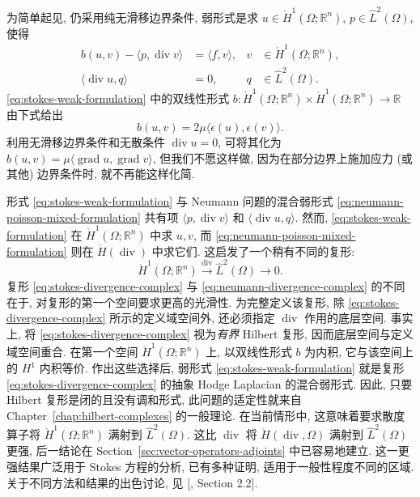 {为简单起见, 仍采用纯无滑移边界条件, 弱形式是求 $u\in\mathring H^1(\Omega;\mathbb R^n)$, $p\in\hat L^2(\Omega)$, 使得}
\begin{equation}\label{eq:stokes-weak-formulation}
\begin{aligned}b(u,v)-\langle p,\operatorname{div}v\rangle&=\langle f,v\rangle,&v&\in\mathring H^1(\Omega;\mathbb R^n),\\\langle\operatorname{div}u,q\rangle&=0,&q&\in\hat L^2(\Omega).\end{aligned}
\end{equation}
{\eqref{eq:stokes-weak-formulation} 中的双线性形式 $b:\mathring H^1(\Omega;\mathbb R^n)\times\mathring H^1(\Omega;\mathbb R^n)\to\mathbb R$ 由下式给出}
\begin{equation}\label{eq:stokes-strain-bilinear-form}
b(u,v)=2\mu\langle\epsilon(u),\epsilon(v)\rangle.
\end{equation}
{利用无滑移边界条件和无散条件 $\operatorname{div}u=0$, 可将其化为 $b(u,v)=\mu\langle\operatorname{grad}u,\operatorname{grad}v\rangle$, 但我们不愿这样做, 因为在部分边界上施加应力 (或其他) 边界条件时, 就不再能这样化简.}

{形式 \eqref{eq:stokes-weak-formulation} 与 Neumann 问题的混合弱形式 \eqref{eq:neumann-poisson-mixed-formulation} 共有项 $\langle p,\operatorname{div}v\rangle$ 和 $\langle\operatorname{div}u,q\rangle$. 然而, \eqref{eq:stokes-weak-formulation} 在 $\mathring H^1(\Omega;\mathbb R^n)$ 中求 $u,v$, 而 \eqref{eq:neumann-poisson-mixed-formulation} 则在 $\mathring H(\operatorname{div})$ 中求它们. 这启发了一个稍有不同的复形:}
\begin{equation}\label{eq:stokes-divergence-complex}
\mathring H^1(\Omega;\mathbb R^n)\xrightarrow{\operatorname{div}}\hat L^2(\Omega)\to0.
\end{equation}
{复形 \eqref{eq:stokes-divergence-complex} 与 \eqref{eq:neumann-divergence-complex} 的不同在于, 对复形的第一个空间要求更高的光滑性. 为完整定义该复形, 除 \eqref{eq:stokes-divergence-complex} 所示的定义域空间外, 还必须指定 $\operatorname{div}$ 作用的底层空间. 事实上, 将 \eqref{eq:stokes-divergence-complex} 视为\emph{有界} Hilbert 复形, 因而底层空间与定义域空间重合. 在第一个空间 $\mathring H^1(\Omega;\mathbb R^n)$ 上, 以双线性形式 $b$ 为内积, 它与该空间上的 $H^1$ 内积等价. 作出这些选择后, 弱形式 \eqref{eq:stokes-weak-formulation} 就是复形 \eqref{eq:stokes-divergence-complex} 的抽象 Hodge Laplacian 的混合弱形式. 因此, 只要 Hilbert 复形是闭的且没有调和形式, 此问题的适定性就来自 Chapter~\ref{chap:hilbert-complexes} 的一般理论. 在当前情形中, 这意味着要求散度算子将 $\mathring H^1(\Omega;\mathbb R^n)$ 满射到 $\hat L^2(\Omega)$. 这比 $\operatorname{div}$ 将 $\mathring H(\operatorname{div},\Omega)$ 满射到 $\hat L^2(\Omega)$ 更强, 后一结论在 Section~\ref{sec:vector-operators-adjoints} 中已容易地建立. 这一更强结果广泛用于 Stokes 方程的分析, 已有多种证明, 适用于一般性程度不同的区域. 关于不同方法和结果的出色讨论, 见 [, Section 2.2].}

